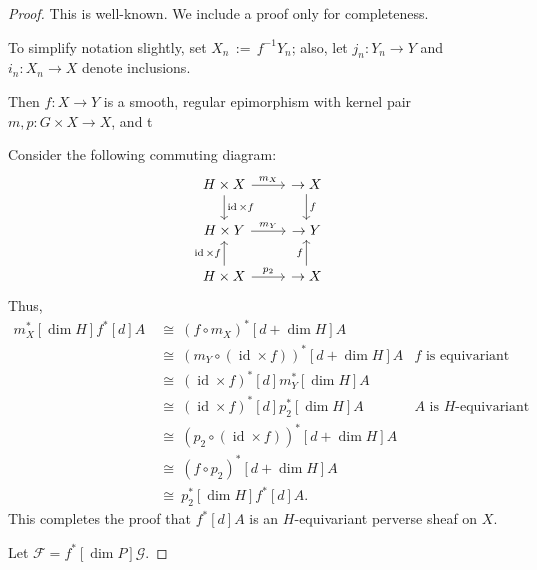 \documentclass[10pt]{amsart}
\theoremstyle{plain}
\theoremstyle{definition}
\DeclareMathOperator{\id}{id}
\newcommand{\ceq}{{\, :=\, }}
\newcommand{\iso}{{\ \cong\ }}
\begin{document}
\begin{proof}
This is well-known. We include a proof only for completeness.

To simplify notation slightly, set ${X}_n \ceq {f}^{-1}{Y}_n$; also, let ${j}_n : {Y}_n \to {Y}$ and ${i}_n : {X}_n \to {X}$ denote inclusions.

Then $f : X \to Y$ is a smooth, regular epimorphism with kernel pair $m, p: G\times X\to X$, and t

Consider the following commuting diagram:
\[
\begin{tikzcd}
H\times X \arrow{d}{\id\times f} \arrow{r}{m_X}&\to X\arrow{d}{f}\\
H\times Y \arrow{r}{m_Y} &\to Y\\
H\times X \arrow{r}{p_2} \arrow{u}{\id\times f} &\to X \arrow{u}{f}
\end{tikzcd}
\]
Thus,
\[
\begin{aligned}
m_X^*[\dim H] f^*[d] A
&\iso (f\circ m_X)^* [d+\dim H]A  &\\
&\iso (m_Y\circ (\id\times f))^*[d+\dim H]A & \text{$f$ is equivariant}\\
&\iso (\id\times f)^*[d] m_Y^*[\dim H] A &\\
&\iso  (\id\times f)^*[d] p_2^*[\dim H] A &\text{$A$ is $H$-equivariant}\\
&\iso  (p_2\circ (\id\times f))^*[d+\dim H] A &\\
&\iso (f\circ p_2)^*[d+\dim H]A & \\
&\iso p_2^*[\dim H] f^*[d]A. &
\end{aligned}
\]
This completes the proof that $f^*[d]A$ is an $H$-equivariant perverse sheaf on $X$.

Let $\mathcal{F} = {f}^*[\dim{P}] \mathcal{G}$. 


\end{proof}
\end{document}
